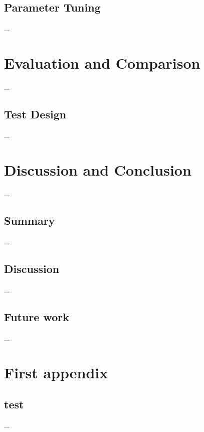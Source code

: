 \section{Parameter Tuning}\label{c.training.tuning}
...

\chapter{Evaluation and Comparison}\label{c.evaluation}
...

\section{Test Design}\label{c.evaluation.test}
...

\chapter{Discussion and Conclusion}\label{c.conclusion}
...

\section{Summary}\label{c.conclusion.summary}
...

\section{Discussion}\label{c.conclusion.discussion}
...

\section{Future work}\label{c.conclusion.future}
...
\cite{michael2016}
\cite{mueller2015}
\cite{ma2000}
\cite{schmid1994}

% 
% 
% 
% 
% 



\appendix
\chapter{First appendix}

\section{test}
...

